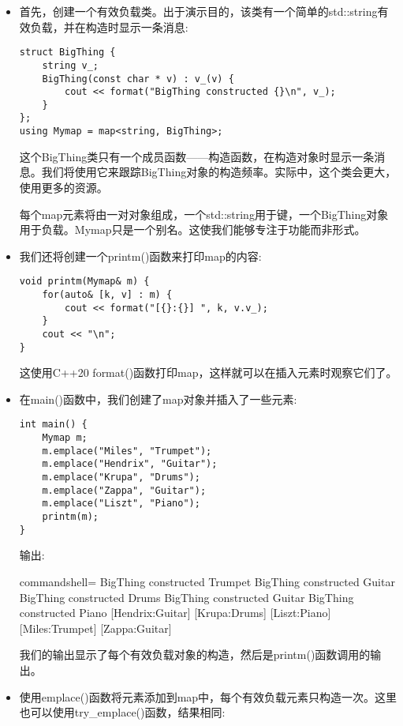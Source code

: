 \begin{itemize}
\item 
首先，创建一个有效负载类。出于演示目的，该类有一个简单的std::string有效负载，并在构造时显示一条消息:

\begin{lstlisting}[style=styleCXX]
struct BigThing {
	string v_;
	BigThing(const char * v) : v_(v) {
		cout << format("BigThing constructed {}\n", v_);
	}
};
using Mymap = map<string, BigThing>;
\end{lstlisting}

这个BigThing类只有一个成员函数——构造函数，在构造对象时显示一条消息。我们将使用它来跟踪BigThing对象的构造频率。实际中，这个类会更大，使用更多的资源。

每个map元素将由一对对象组成，一个std::string用于键，一个BigThing对象用于负载。Mymap只是一个别名。这使我们能够专注于功能而非形式。

\item 
我们还将创建一个printm()函数来打印map的内容:

\begin{lstlisting}[style=styleCXX]
void printm(Mymap& m) {
	for(auto& [k, v] : m) {
		cout << format("[{}:{}] ", k, v.v_);
	}
	cout << "\n";
}
\end{lstlisting}

这使用C++20 format()函数打印map，这样就可以在插入元素时观察它们了。

\item 
在main()函数中，我们创建了map对象并插入了一些元素:

\begin{lstlisting}[style=styleCXX]
int main() {
	Mymap m;
	m.emplace("Miles", "Trumpet");
	m.emplace("Hendrix", "Guitar");
	m.emplace("Krupa", "Drums");
	m.emplace("Zappa", "Guitar");
	m.emplace("Liszt", "Piano");
	printm(m);
}
\end{lstlisting}

输出:

\begin{tcblisting}{commandshell={}}
BigThing constructed Trumpet
BigThing constructed Guitar
BigThing constructed Drums
BigThing constructed Guitar
BigThing constructed Piano
[Hendrix:Guitar] [Krupa:Drums] [Liszt:Piano]
[Miles:Trumpet] [Zappa:Guitar]
\end{tcblisting}

我们的输出显示了每个有效负载对象的构造，然后是printm()函数调用的输出。

\item 
使用emplace()函数将元素添加到map中，每个有效负载元素只构造一次。这里也可以使用try\_emplace()函数，结果相同:


\end{itemize}
